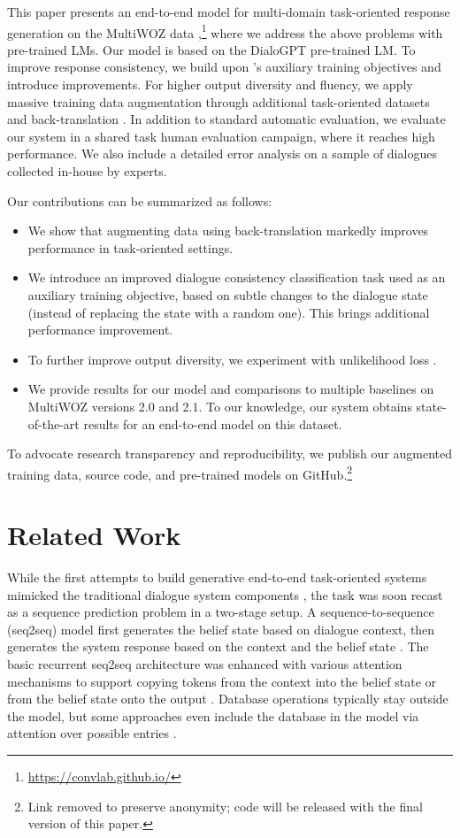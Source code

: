 \documentclass[11pt,a4paper]{article}
\newcommand{\Augpt}[0]{Our model\xspace}
\begin{document}
This paper presents an end-to-end model for multi-domain task-oriented response generation on the MultiWOZ data \cite{budzianowski2018},\footnote{\url{https://convlab.github.io/}} where we address the above problems with pre-trained LMs. \Augpt is based on the DialoGPT pre-trained LM. To improve response consistency, we build upon \citet{peng2020}'s auxiliary training objectives and introduce improvements. For higher output diversity and fluency, we apply massive training data augmentation through additional task-oriented datasets and back-translation \cite{sennrich2016}. In addition to standard automatic evaluation, we evaluate our system in a shared task human evaluation campaign, where it reaches high performance. We also include a detailed error analysis on a sample of dialogues collected in-house by experts.

Our contributions can be summarized as follows:
\begin{itemize}
    \item We show that augmenting data using back-translation markedly improves performance in task-oriented settings.
    \item We introduce an improved dialogue consistency classification task used as an auxiliary training objective, based on subtle changes to the dialogue state (instead of replacing the state with a random one). This brings additional performance improvement.
    \item To further improve output diversity, we experiment with unlikelihood loss \cite{welleck2019,li_dont_2020}.
    \item We provide results for our model and comparisons to multiple baselines on MultiWOZ versions 2.0 and 2.1. To our knowledge, our system obtains state-of-the-art results for an end-to-end model on this dataset.
\end{itemize}

To advocate research transparency and reproducibility, we publish our augmented training data, source code, and pre-trained models on GitHub.\footnote{Link removed to preserve anonymity; code will be released with the final version of this paper.}

\section{Related Work}

While the first attempts to build generative end-to-end task-oriented systems mimicked the traditional dialogue system components \citep{wen2017}, the task was soon recast as a sequence prediction problem in a two-stage setup. A sequence-to-sequence (seq2seq) model first generates the belief state based on dialogue context, then generates the system response based on the context and the belief state \cite[Sequicity;][]{lei2018}.
The basic recurrent seq2seq architecture \cite{sutskever2014} was enhanced with various attention mechanisms to support copying tokens from the context into the belief state or from the belief state onto the output \cite{wu2018, shu2019}. Database operations typically stay outside the model, but some approaches even include the database in the model via attention over possible entries \cite{manning2017,wen2018,madotto2018}. 
\end{document}
